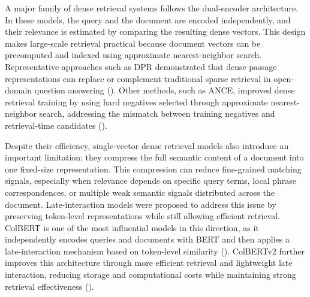 \documentclass[preprint,5p,times,twocolumn,authoryear]{elsarticle}
\begin{document}
A major family of dense retrieval systems follows the dual-encoder architecture. In these models, the query and the document are encoded independently, and their relevance is estimated by comparing the resulting dense vectors. This design makes large-scale retrieval practical because document vectors can be precomputed and indexed using approximate nearest-neighbor search. Representative approaches such as DPR demonstrated that dense passage representations can replace or complement traditional sparse retrieval in open-domain question answering (\cite{dpr}). Other methods, such as ANCE, improved dense retrieval training by using hard negatives selected through approximate nearest-neighbor search, addressing the mismatch between training negatives and retrieval-time candidates (\cite{ance}).

Despite their efficiency, single-vector dense retrieval models also introduce an important limitation: they compress the full semantic content of a document into one fixed-size representation. This compression can reduce fine-grained matching signals, especially when relevance depends on specific query terms, local phrase correspondences, or multiple weak semantic signals distributed across the document. Late-interaction models were proposed to address this issue by preserving token-level representations while still allowing efficient retrieval. ColBERT is one of the most influential models in this direction, as it independently encodes queries and documents with BERT and then applies a late-interaction mechanism based on token-level similarity (\cite{colbert}). ColBERTv2 further improves this architecture through more efficient retrieval and lightweight late interaction, reducing storage and computational costs while maintaining strong retrieval effectiveness (\cite{v2}).
\end{document}
